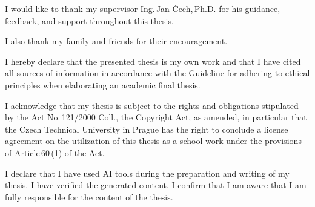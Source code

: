 \documentclass[english,bachelor,oneside]{ctufit-thesis}
\begin{document}
\frontmatter\frontmatterinit %

\thispagestyle{empty}\maketitle\thispagestyle{empty}\cleardoublepage %



\imprintpage %
\stopTOCentries

\begin{acknowledgmentpage}
I would like to thank my supervisor Ing.\,Jan Čech,\,Ph.D. for his guidance,
feedback, and support throughout this thesis.

I also thank my family and friends for their encouragement.
\end{acknowledgmentpage}


\begin{declarationpage}
I hereby declare that the presented thesis is my own work and that I have cited all
sources of information in accordance with the Guideline for adhering to ethical
principles when elaborating an academic final thesis.

I acknowledge that my thesis is subject to the rights and obligations stipulated by the
Act No.\,121/2000 Coll., the Copyright Act, as amended, in particular that the Czech
Technical University in Prague has the right to conclude a license agreement on the
utilization of this thesis as a school work under the provisions of Article\,60\,(1) of the
Act.

I declare that I have used AI tools during the preparation and writing of my thesis.
I have verified the generated content. I confirm that I am aware that I am fully
responsible for the content of the thesis.
\end{declarationpage}
\end{document}
